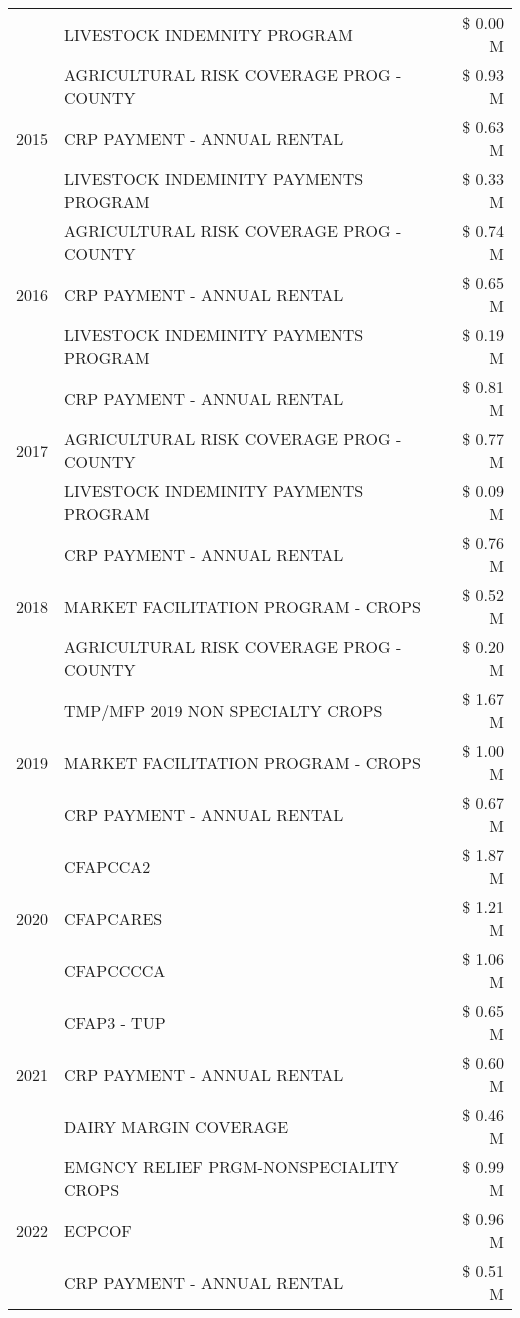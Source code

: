 \begin{tabular}{llr}
 & LIVESTOCK INDEMNITY PROGRAM & \$ 0.00 M \\
\cline{1-3}
\multirow[t]{3}{*}{2015} & AGRICULTURAL RISK COVERAGE PROG - COUNTY & \$ 0.93 M \\
 & CRP PAYMENT - ANNUAL RENTAL & \$ 0.63 M \\
 & LIVESTOCK INDEMINITY PAYMENTS PROGRAM & \$ 0.33 M \\
\cline{1-3}
\multirow[t]{3}{*}{2016} & AGRICULTURAL RISK COVERAGE PROG - COUNTY & \$ 0.74 M \\
 & CRP PAYMENT - ANNUAL RENTAL & \$ 0.65 M \\
 & LIVESTOCK INDEMINITY PAYMENTS PROGRAM & \$ 0.19 M \\
\cline{1-3}
\multirow[t]{3}{*}{2017} & CRP PAYMENT - ANNUAL RENTAL & \$ 0.81 M \\
 & AGRICULTURAL RISK COVERAGE PROG - COUNTY & \$ 0.77 M \\
 & LIVESTOCK INDEMINITY PAYMENTS PROGRAM & \$ 0.09 M \\
\cline{1-3}
\multirow[t]{3}{*}{2018} & CRP PAYMENT - ANNUAL RENTAL & \$ 0.76 M \\
 & MARKET FACILITATION PROGRAM - CROPS & \$ 0.52 M \\
 & AGRICULTURAL RISK COVERAGE PROG - COUNTY & \$ 0.20 M \\
\cline{1-3}
\multirow[t]{3}{*}{2019} & TMP/MFP 2019 NON SPECIALTY CROPS & \$ 1.67 M \\
 & MARKET FACILITATION PROGRAM - CROPS & \$ 1.00 M \\
 & CRP PAYMENT - ANNUAL RENTAL & \$ 0.67 M \\
\cline{1-3}
\multirow[t]{3}{*}{2020} & CFAPCCA2 & \$ 1.87 M \\
 & CFAPCARES & \$ 1.21 M \\
 & CFAPCCCCA & \$ 1.06 M \\
\cline{1-3}
\multirow[t]{3}{*}{2021} & CFAP3 - TUP & \$ 0.65 M \\
 & CRP PAYMENT - ANNUAL RENTAL & \$ 0.60 M \\
 & DAIRY MARGIN COVERAGE & \$ 0.46 M \\
\cline{1-3}
\multirow[t]{3}{*}{2022} & EMGNCY RELIEF PRGM-NONSPECIALITY CROPS & \$ 0.99 M \\
 & ECPCOF & \$ 0.96 M \\
 & CRP PAYMENT - ANNUAL RENTAL & \$ 0.51 M \\
\cline{1-3}
\bottomrule
\end{tabular}
